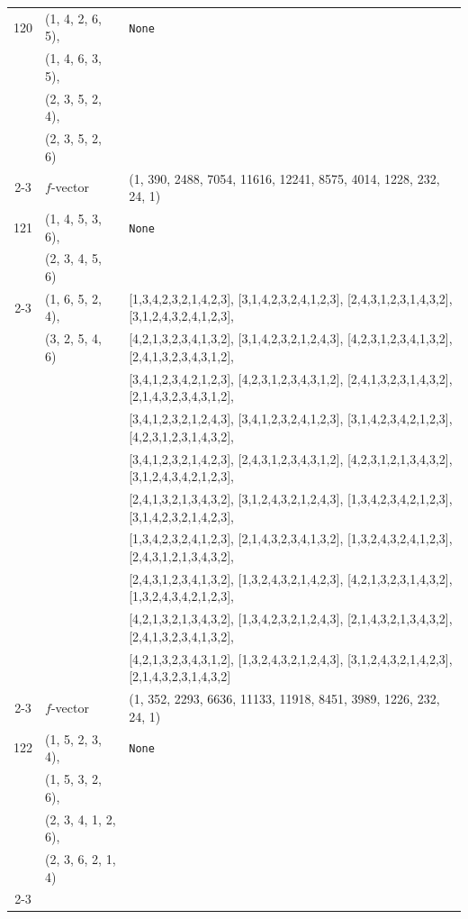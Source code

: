 \documentclass[10pt]{amsart}
\numberwithin{equation}{section}
\theoremstyle{plain}
\theoremstyle{definition}
\theoremstyle{remark}
\begin{document}
{\begin{longtable}{c|l|l}
		120 & (1, 4, 2, 6, 5), & \texttt{None} \\
		& (1, 4, 6, 3, 5), &  \\
		& (2, 3, 5, 2, 4), &  \\
		& (2, 3, 5, 2, 6) &  \\ \cline{2-3}
		
		& $f$-vector & {(1, 390, 2488, 7054, 11616, 12241, 8575, 4014, 1228, 232, 24, 1)} \\
		\midrule
		
		121 & (1, 4, 5, 3, 6), & \texttt{None} \\
		& (2, 3, 4, 5, 6) &  \\ \cline{2-3}
		
		& (1, 6, 5, 2, 4), & [1,3,4,2,3,2,1,4,2,3], [3,1,4,2,3,2,4,1,2,3], [2,4,3,1,2,3,1,4,3,2], [3,1,2,4,3,2,4,1,2,3], \\
		& (3, 2, 5, 4, 6) & [4,2,1,3,2,3,4,1,3,2], [3,1,4,2,3,2,1,2,4,3], [4,2,3,1,2,3,4,1,3,2], [2,4,1,3,2,3,4,3,1,2], \\
		&  & [3,4,1,2,3,4,2,1,2,3], [4,2,3,1,2,3,4,3,1,2], [2,4,1,3,2,3,1,4,3,2], [2,1,4,3,2,3,4,3,1,2], \\
		&  & [3,4,1,2,3,2,1,2,4,3], [3,4,1,2,3,2,4,1,2,3], [3,1,4,2,3,4,2,1,2,3], [4,2,3,1,2,3,1,4,3,2], \\
		&  & [3,4,1,2,3,2,1,4,2,3], [2,4,3,1,2,3,4,3,1,2], [4,2,3,1,2,1,3,4,3,2], [3,1,2,4,3,4,2,1,2,3], \\
		&  & [2,4,1,3,2,1,3,4,3,2], [3,1,2,4,3,2,1,2,4,3], [1,3,4,2,3,4,2,1,2,3], [3,1,4,2,3,2,1,4,2,3], \\
		&  & [1,3,4,2,3,2,4,1,2,3], [2,1,4,3,2,3,4,1,3,2], [1,3,2,4,3,2,4,1,2,3], [2,4,3,1,2,1,3,4,3,2], \\
		&  & [2,4,3,1,2,3,4,1,3,2], [1,3,2,4,3,2,1,4,2,3], [4,2,1,3,2,3,1,4,3,2], [1,3,2,4,3,4,2,1,2,3], \\
		&  & [4,2,1,3,2,1,3,4,3,2], [1,3,4,2,3,2,1,2,4,3], [2,1,4,3,2,1,3,4,3,2], [2,4,1,3,2,3,4,1,3,2], \\
		&  & [4,2,1,3,2,3,4,3,1,2], [1,3,2,4,3,2,1,2,4,3], [3,1,2,4,3,2,1,4,2,3], [2,1,4,3,2,3,1,4,3,2] \\ \cline{2-3}
		
		& $f$-vector & {(1, 352, 2293, 6636, 11133, 11918, 8451, 3989, 1226, 232, 24, 1)} \\
		\midrule
		
		122 & (1, 5, 2, 3, 4), & \texttt{None} \\
		& (1, 5, 3, 2, 6), &  \\
		& (2, 3, 4, 1, 2, 6), &  \\
		& (2, 3, 6, 2, 1, 4) &  \\ \cline{2-3}
		

\end{longtable}}
\end{document}
